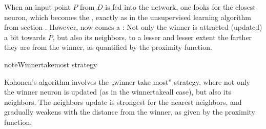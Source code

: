 \documentclass[a4paper,12pt,polish]{jupyterBook}
\begin{document}
\sphinxAtStartPar
When an input point \(P\) from \(D\) is fed into the network, one looks for the closest neuron, which becomes the , exactly as in the unsupervised learning algorithm from section {\hyperref[\detokenize{docs/unsupervised:inn-sec}]{}}. However, now comes a : Not only the winner is attracted (updated) a bit towards \(P\), but also its neighbors, to a lesser and lesser extent the farther they are from the winner, as quantified by the proximity function.

\begin{sphinxadmonition}{note}{Winner\sphinxhyphen{}take\sphinxhyphen{}most strategy}

\sphinxAtStartPar
Kohonen’s algorithm involves the „winner take most” strategy, where not only the winner neuron is updated (as in the winner\sphinxhyphen{}take\sphinxhyphen{}all case), but also its neighbors. The neighbors update is strongest for the nearest neighbors, and gradually weakens with the distance from the winner, as given by the proximity function.
\end{sphinxadmonition}
\end{document}
